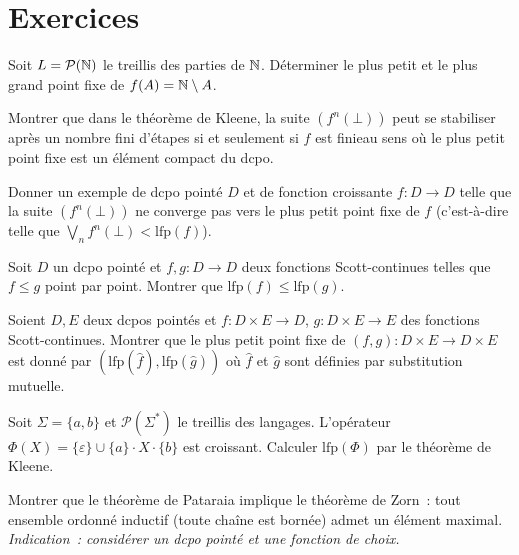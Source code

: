 \section{Exercices}

\begin{exercice}
Soit $L = \mathcal{P}(\mathbb{N})$ le treillis des parties de $\mathbb{N}$. D\'eterminer le plus petit
et le plus grand point fixe de $f(A) = \mathbb{N} \setminus A$.
\end{exercice}

\begin{exercice}
Montrer que dans le th\'eor\`eme de Kleene, la suite $(f^n(\bot))$ peut se stabiliser apr\`es
un nombre fini d'\'etapes si et seulement si $f$ est \og{}finie\fg au sens o\`u le plus
petit point fixe est un \'el\'ement compact du dcpo.
\end{exercice}

\begin{exercice}
Donner un exemple de dcpo point\'e $D$ et de fonction croissante $f\colon D \to D$ telle
que la suite $(f^n(\bot))$ ne converge pas vers le plus petit point fixe de $f$ (c'est-\`a-dire
telle que $\bigvee_n f^n(\bot) < \mathrm{lfp}(f)$).
\end{exercice}

\begin{exercice}
Soit $D$ un dcpo point\'e et $f, g\colon D \to D$ deux fonctions Scott-continues telles que
$f \leq g$ point par point. Montrer que $\mathrm{lfp}(f) \leq \mathrm{lfp}(g)$.
\end{exercice}

\begin{exercice}
Soient $D, E$ deux dcpos point\'es et $f\colon D \times E \to D$, $g\colon D \times E \to E$
des fonctions Scott-continues. Montrer que le plus petit point fixe de $(f,g)\colon D \times E
\to D \times E$ est donn\'e par $(\mathrm{lfp}(\hat{f}), \mathrm{lfp}(\hat{g}))$ o\`u
$\hat{f}$ et $\hat{g}$ sont d\'efinies par substitution mutuelle.
\end{exercice}

\begin{exercice}
Soit $\Sigma = \{a, b\}$ et $\mathcal{P}(\Sigma^*)$ le treillis des langages.
L'op\'erateur $\Phi(X) = \{\varepsilon\} \cup \{a\} \cdot X \cdot \{b\}$ est croissant.
Calculer $\mathrm{lfp}(\Phi)$ par le th\'eor\`eme de Kleene.
\end{exercice}

\begin{exercice}
Montrer que le th\'eor\`eme de Pataraia implique le th\'eor\`eme de Zorn~: tout ensemble
ordonn\'e inductif (toute cha\^ine est born\'ee) admet un \'el\'ement maximal.
\emph{Indication~: consid\'erer un dcpo point\'e et une fonction de choix.}
\end{exercice}
